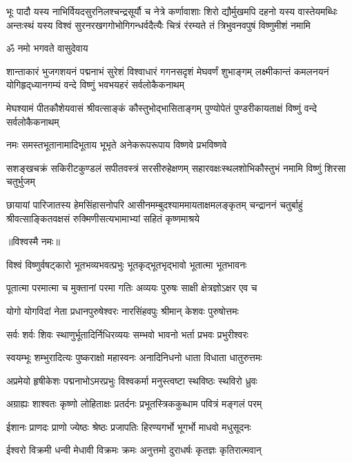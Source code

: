 \fourlineindentedshloka
{भूः पादौ यस्य नाभिर्वियदसुरनिलश्चन्द्रसूर्यौ च नेत्रे}
{कर्णावाशाः शिरो द्यौर्मुखमपि दहनो यस्य वास्तेयमब्धिः}
{अन्तःस्थं यस्य विश्वं सुरनरखगगोभोगिगन्धर्वदैत्यैः}
{चित्रं रंरम्यते तं त्रिभुवनवपुषं विष्णुमीशं नमामि}

\centerline{ॐ नमो भगवते वासुदेवाय}
\fourlineindentedshloka
{शान्ताकारं भुजगशयनं पद्मनाभं सुरेशं}
{विश्वाधारं गगनसदृशं मेघवर्णं शुभाङ्गम्}
{लक्ष्मीकान्तं कमलनयनं योगिहृद्‌ध्यानगम्यं}
{वन्दे विष्णुं भवभयहरं सर्वलोकैकनाथम्}

\fourlineindentedshloka
{मेघश्यामं पीतकौशेयवासं}
{श्रीवत्साङ्कं कौस्तुभोद्भासिताङ्गम्}
{पुण्योपेतं पुण्डरीकायताक्षं}
{विष्णुं वन्दे सर्वलोकैकनाथम्}

\twolineshloka
{नमः समस्तभूतानामादिभूताय भूभृते}
{अनेकरूपरूपाय विष्णवे प्रभविष्णवे}

\fourlineindentedshloka
{सशङ्खचक्रं सकिरीटकुण्डलं}
{सपीतवस्त्रं सरसीरुहेक्षणम्}
{सहारवक्षःस्थलशोभिकौस्तुभं}
{नमामि विष्णुं शिरसा चतुर्भुजम्}

\fourlineindentedshloka
{छायायां पारिजातस्य हेमसिंहासनोपरि}
{आसीनमम्बुदश्याममायताक्षमलङ्कृतम्}
{चन्द्राननं चतुर्बाहुं श्रीवत्साङ्कितवक्षसं}
{रुक्मिणीसत्यभामाभ्यां सहितं कृष्णमाश्रये}

\centerline{॥विश्वस्मै नमः॥}\nopagebreak[4]
\resetShloka
\twolineshloka
{विश्वं विष्णुर्वषट्कारो भूतभव्यभवत्प्रभुः}
{भूतकृद्भूतभृद्भावो भूतात्मा भूतभावनः}

\twolineshloka
{पूतात्मा परमात्मा च मुक्तानां परमा गतिः}
{अव्ययः पुरुषः साक्षी क्षेत्रज्ञोऽक्षर एव च}

\twolineshloka
{योगो योगविदां नेता प्रधानपुरुषेश्वरः}
{नारसिंहवपुः श्रीमान् केशवः पुरुषोत्तमः}

\twolineshloka
{सर्वः शर्वः शिवः स्थाणुर्भूतादिर्निधिरव्ययः}
{सम्भवो भावनो भर्ता प्रभवः प्रभुरीश्वरः}

\twolineshloka
{स्वयम्भूः शम्भुरादित्यः पुष्कराक्षो महास्वनः}
{अनादिनिधनो धाता विधाता धातुरुत्तमः}

\twolineshloka
{अप्रमेयो हृषीकेशः पद्मनाभोऽमरप्रभुः}
{विश्वकर्मा मनुस्त्वष्टा स्थविष्ठः स्थविरो ध्रुवः}

\twolineshloka
{अग्राह्यः शाश्वतः कृष्णो लोहिताक्षः प्रतर्दनः}
{प्रभूतस्त्रिककुब्धाम पवित्रं मङ्गलं परम्}

\twolineshloka
{ईशानः प्राणदः प्राणो ज्येष्ठः श्रेष्ठः प्रजापतिः}
{हिरण्यगर्भो भूगर्भो माधवो मधुसूदनः}

\twolineshloka
{ईश्वरो विक्रमी धन्वी मेधावी विक्रमः क्रमः}
{अनुत्तमो दुराधर्षः कृतज्ञः कृतिरात्मवान्}

